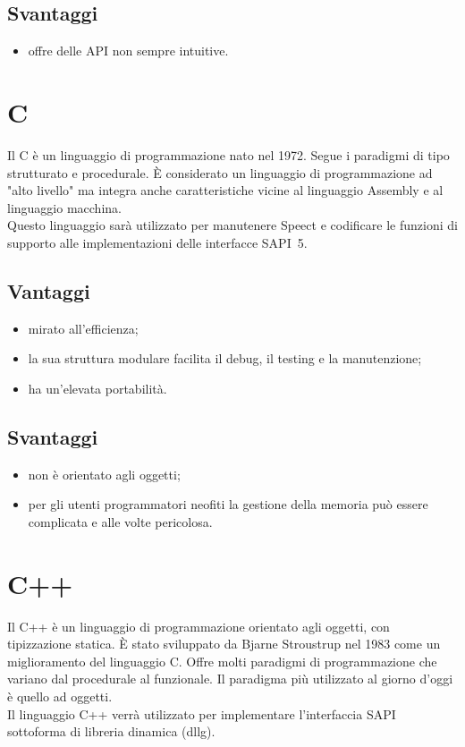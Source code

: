 \subsection*{Svantaggi}
\begin{itemize}
	\item offre delle API non sempre intuitive.
\end{itemize}
\section{C}
Il C è un linguaggio di programmazione nato nel 1972. Segue i paradigmi di tipo strutturato e procedurale. È considerato un linguaggio di programmazione ad "alto livello" ma integra anche caratteristiche vicine al linguaggio Assembly e al linguaggio macchina.\\
Questo linguaggio sarà utilizzato per manutenere Speect e codificare le funzioni di supporto alle implementazioni delle interfacce SAPI~5.
\subsection*{Vantaggi}
\begin{itemize}
	\item mirato all'efficienza;
	\item la sua struttura modulare facilita il debug, il testing e la manutenzione;
	\item ha un'elevata portabilità.
\end{itemize}
\subsection*{Svantaggi}
\begin{itemize}
	\item non è orientato agli oggetti;
	\item per gli utenti programmatori neofiti la gestione della memoria può essere complicata e alle volte pericolosa.
\end{itemize}
\section{C++}
Il C++ è un linguaggio di programmazione orientato agli oggetti, con tipizzazione statica. È stato sviluppato da Bjarne Stroustrup nel 1983 come un miglioramento del linguaggio C.
Offre molti paradigmi di programmazione che variano dal procedurale al funzionale.
Il paradigma più utilizzato al giorno d'oggi è quello ad oggetti.\\
Il linguaggio C++ verrà utilizzato per implementare l'interfaccia SAPI sottoforma di libreria dinamica (\gls{dllg}).
